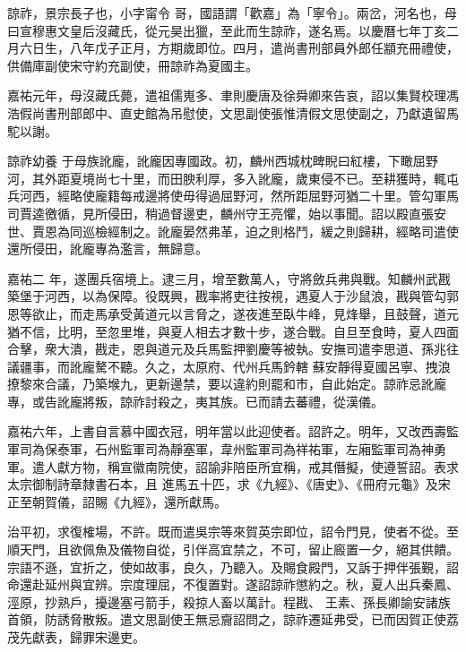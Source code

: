 \begin{pinyinscope}
 諒祚，景宗長子也，小字甯令
 哥，國語謂「歡嘉」為「寧令」。兩岔，河名也，母曰宣穆惠文皇后沒藏氏，從元昊出獵，至此而生諒祚，遂名焉。以慶曆七年丁亥二月六日生，八年戊子正月，方期歲即位。四月，遣尚書刑部員外郎任顓充冊禮使，供備庫副使宋守約充副使，冊諒祚為夏國主。



 嘉祐元年，母沒藏氏薨，遣祖儒嵬多、聿則慶唐及徐舜卿來告哀，詔以集賢校理馮浩假尚書刑部郎中、直史館為吊慰使，文思副使張惟清假文思使副之，乃獻遺留馬駝以謝。



 諒祚幼養
 于母族訛龐，訛龐因專國政。初，麟州西城枕睥睨曰紅樓，下瞰屈野河，其外距夏境尚七十里，而田腴利厚，多入訛龐，歲東侵不已。至耕獲時，輒屯兵河西，經略使龐籍每戒邊將使毋得過屈野河，然所距屈野河猶二十里。管勾軍馬司賈逵徼循，見所侵田，稍過督邊吏，麟州守王亮懼，始以事聞。詔以殿直張安世、賈恩為同巡檢經制之。訛龐晏然弗革，迫之則格鬥，緩之則歸耕，經略司遣使還所侵田，訛龐專為濫言，無歸意。



 嘉祐二
 年，遂團兵宿境上。逮三月，增至數萬人，守將斂兵弗與戰。知麟州武戡築堡于河西，以為保障。役既興，戡率將吏往按視，遇夏人于沙鼠浪，戡與管勾郭恩等欲止，而走馬承受黃道元以言脅之，遂夜進至臥牛峰，見烽舉，且鼓聲，道元猶不信，比明，至忽里堆，與夏人相去才數十步，遂合戰。自旦至食時，夏人四面合擊，衆大潰，戡走，恩與道元及兵馬監押劉慶等被執。安撫司遣李思道、孫兆往議疆事，而訛龐驁不聽。久之，太原府、代州兵馬鈐轄
 蘇安靜得夏國呂寧、拽浪撩黎來合議，乃築堠九，更新邊禁，要以違約則罷和市，自此始定。諒祚忌訛龐專，或告訛龐將叛，諒祚討殺之，夷其族。已而請去蕃禮，從漢儀。



 嘉祐六年，上書自言慕中國衣冠，明年當以此迎使者。詔許之。明年，又改西壽監軍司為保泰軍，石州監軍司為靜塞軍，韋州監軍司為祥祐軍，左廂監軍司為神勇軍。遣人獻方物，稱宣徽南院使，詔諭非陪臣所宜稱，戒其僭擬，使遵誓詔。表求太宗御制詩章隸書石本，且
 進馬五十匹，求《九經》、《唐史》、《冊府元龜》及宋正至朝賀儀，詔賜《九經》，還所獻馬。



 治平初，求復榷場，不許。既而遣吳宗等來賀英宗即位，詔令門見，使者不從。至順天門，且欲佩魚及儀物自從，引伴高宜禁之，不可，留止廄置一夕，絕其供饋。宗語不遜，宜折之，使如故事，良久，乃聽入。及賜食殿門，又訴于押伴張覲，詔命還赴延州與宜辨。宗度理屈，不復置對。遂詔諒祚懲約之。秋，夏人出兵秦鳳、涇原，抄熟戶，擾邊塞弓箭手，殺掠人畜以萬計。程戡、
 王素、孫長卿諭安諸族首領，防誘脅散叛。遣文思副使王無忌齎詔問之，諒祚遷延弗受，已而因賀正使荔茂先獻表，歸罪宋邊吏。




\end{pinyinscope}
